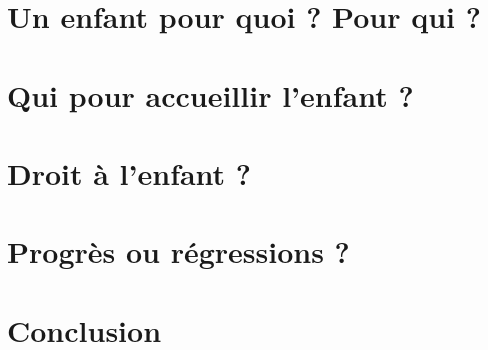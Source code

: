 \documentclass[12pt,french]{book}
\begin{document}
\chapter{Un enfant pour quoi ? Pour qui ?}


\chapter{Qui pour accueillir l'enfant ?}


\chapter{Droit à l'enfant ?}


\chapter{Progrès ou régressions ?}


\chapter{Conclusion}



\backmatter

\tableofcontents
\end{document}
